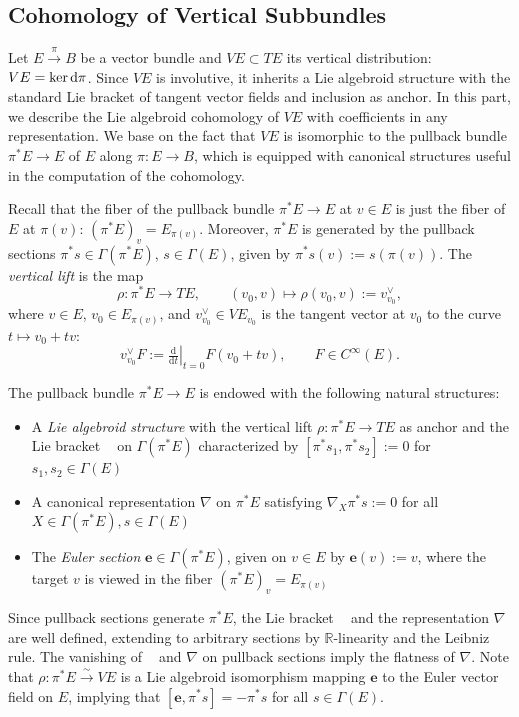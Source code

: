 \documentclass[12pt,letterpaper]{article}
\newcommand{\R}{\mathbb{R}}
\let\oldd\d
\renewcommand{\d}{%
  \relax\ifmmode\mathrm{d}\else\oldd\fi
}
\newcommand{\e}{\mathbf{e}}
\DeclareMathOperator{\dcd}{\,\cdot\,,\cdot\,}
\DeclareMathOperator{\brk}{[\dcd]}
\numberwithin{equation}{section}
\begin{document}
\subsection{Cohomology of Vertical Subbundles}

Let $E\overset{\pi}{\to}B$ be a vector bundle and $VE\subset TE$ its vertical distribution: $VE=\ker\d\pi$.
Since $VE$ is involutive, it inherits a Lie algebroid structure with the standard Lie bracket of tangent vector fields and inclusion as anchor.
In this part, we describe the Lie algebroid cohomology of $VE$ with coefficients in any representation.
We base on the fact that $VE$ is isomorphic to the pullback bundle $\pi^*E\to E$ of $E$ along $\pi: E\to B$,
which is equipped with canonical structures useful in the computation of the cohomology.

Recall that the fiber of the pullback bundle $\pi^*E\to E$ at $v\in E$ is just the fiber of $E$ at $\pi(v)$: $(\pi^*E)_v=E_{\pi(v)}$.
Moreover, $\pi^*E$ is generated by the pullback sections $\pi^*s\in\Gamma(\pi^*E)$, $s\in\Gamma(E)$,
given by $\pi^*s(v):=s(\pi(v))$.
The \emph{vertical lift} is the map
\begin{equation}\label{eq:vertlift1}
  \rho: \pi^*E \to TE, \qquad (v_0,v)\mapsto \rho(v_0,v):=v_{v_0}^{\vee}, 
\end{equation}
where $v\in E$, $v_0\in E_{\pi(v)}$, and $v_{v_0}^{\vee}\in VE_{v_0}$ is the tangent vector at $v_0$ to the curve $t\mapsto v_0+t v$:
\[  v_{v_0}^{\vee}F := \left.\tfrac{\mathrm{d}}{\mathrm{d}t}\right|_{t=0}F(v_0+t v), \qquad F\in C^\infty(E). \]

The pullback bundle $\pi^*E\to E$ is endowed with the following natural structures:
\begin{itemize}
\item A \emph{Lie algebroid structure} with the vertical lift $\rho:\pi^*E\to TE$ as anchor 
    and the Lie bracket $\brk$ on $\Gamma(\pi^*E)$ characterized by $[\pi^*s_1,\pi^*s_2]:=0$ for $s_1,s_2\in\Gamma(E)$
\item A canonical representation $\nabla$ on $\pi^*E$ satisfying $\nabla_{X}\pi^*s := 0$ for all $X\in\Gamma(\pi^*E), s\in\Gamma(E)$
\item The \emph{Euler section} $\e\in\Gamma(\pi^*E)$, given on $v\in E$ by $\e(v):=v$,
where the target $v$ is viewed in the fiber $(\pi^*E)_v=E_{\pi(v)}$
\end{itemize}
Since pullback sections generate $\pi^*E$, the Lie bracket $\brk$ and the representation $\nabla$ are well defined,
extending to arbitrary sections by $\R$-linearity and the Leibniz rule.
The vanishing of $\brk$ and $\nabla$ on pullback sections imply the flatness of $\nabla$.
Note that $\rho:\pi^*E\overset{\sim}{\to}VE$ is a Lie algebroid isomorphism mapping $\e$ to the Euler vector field on $E$,
implying that $[\e,\pi^*s]=-\pi^*s$ for all $s\in\Gamma(E)$.
\end{document}
